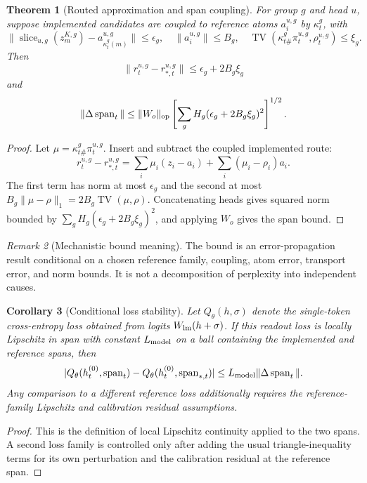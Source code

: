 \documentclass{article}
\theoremstyle{plain}
\newtheorem{theorem}{Theorem}[section]
\newtheorem{corollary}[theorem]{Corollary}
\theoremstyle{definition}
\theoremstyle{remark}
\newtheorem{remark}[theorem]{Remark}
\begin{document}
\begin{theorem}[Routed approximation and span coupling]
\label{thm:mechanistic-decomposition}
For group $g$ and head $u$, suppose implemented candidates are coupled to reference atoms $a_i^{u,g}$ by $\kappa_t^g$, with
\begin{equation}
\|\operatorname{slice}_{u,g}(z_m^{K,g})-a_{\kappa_t^g(m)}^{u,g}\|\le\epsilon_g,
\quad
\|a_i^{u,g}\|\le B_g,
\quad
\operatorname{TV}(\kappa_{t\#}^g\pi_t^{u,g},\rho_t^{u,g})\le\xi_g.
\end{equation}
Then
\begin{equation}
\|r_t^{u,g}-r_{*,t}^{u,g}\|\le\epsilon_g+2B_g\xi_g
\end{equation}
and
\begin{equation}
\|\Delta\operatorname{span}_t\|
\le
\|W_o\|_{\rm op}\left[\sum_gH_g(\epsilon_g+2B_g\xi_g)^2\right]^{1/2}.
\end{equation}
\end{theorem}
\begin{proof}
Let $\mu=\kappa_{t\#}^g\pi_t^{u,g}$.  Insert and subtract the coupled implemented route:
\begin{equation}
r_t^{u,g}-r_{*,t}^{u,g}=\sum_i\mu_i(z_i-a_i)+\sum_i(\mu_i-\rho_i)a_i.
\end{equation}
The first term has norm at most $\epsilon_g$ and the second at most $B_g\|\mu-\rho\|_1=2B_g\operatorname{TV}(\mu,\rho)$.  Concatenating heads gives squared norm bounded by $\sum_gH_g(\epsilon_g+2B_g\xi_g)^2$, and applying $W_o$ gives the span bound.
\end{proof}

\begin{remark}[Mechanistic bound meaning]
\label{rem:mechanistic-bound-meaning}
The bound is an error-propagation result conditional on a chosen reference family, coupling, atom error, transport error, and norm bounds.  It is not a decomposition of perplexity into independent causes.
\end{remark}

\begin{corollary}[Conditional loss stability]
\label{cor:loss-sensitivity-pooling}
Let $Q_\theta(h,\sigma)$ denote the single-token cross-entropy loss obtained
from logits $W_{\rm lm}(h+\sigma)$.  If this readout loss is locally Lipschitz
in span with constant $L_{\rm model}$ on a ball containing the implemented and
reference spans, then
\begin{equation}
|Q_\theta(h_t^{(0)},\operatorname{span}_t)-Q_\theta(h_t^{(0)},\operatorname{span}_{*,t})|
\le L_{\rm model}\|\Delta\operatorname{span}_t\|.
\end{equation}
Any comparison to a different reference loss additionally requires the reference-family Lipschitz and calibration residual assumptions.
\end{corollary}
\begin{proof}
This is the definition of local Lipschitz continuity applied to the two spans.  A second loss family is controlled only after adding the usual triangle-inequality terms for its own perturbation and the calibration residual at the reference span.
\end{proof}
\end{document}
